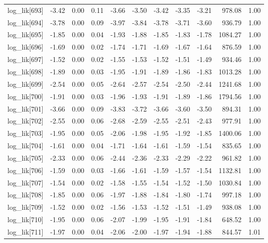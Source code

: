 \begin{table}[ht]
\begin{tabular}{rrrrrrrrrrr}
  log\_lik[693] & -3.42 & 0.00 & 0.11 & -3.66 & -3.50 & -3.42 & -3.35 & -3.21 & 978.08 & 1.00 \\ 
  log\_lik[694] & -3.78 & 0.00 & 0.09 & -3.97 & -3.84 & -3.78 & -3.71 & -3.60 & 936.79 & 1.00 \\ 
  log\_lik[695] & -1.85 & 0.00 & 0.04 & -1.93 & -1.88 & -1.85 & -1.83 & -1.78 & 1084.27 & 1.00 \\ 
  log\_lik[696] & -1.69 & 0.00 & 0.02 & -1.74 & -1.71 & -1.69 & -1.67 & -1.64 & 876.59 & 1.00 \\ 
  log\_lik[697] & -1.52 & 0.00 & 0.02 & -1.55 & -1.53 & -1.52 & -1.51 & -1.49 & 934.46 & 1.00 \\ 
  log\_lik[698] & -1.89 & 0.00 & 0.03 & -1.95 & -1.91 & -1.89 & -1.86 & -1.83 & 1013.28 & 1.00 \\ 
  log\_lik[699] & -2.54 & 0.00 & 0.05 & -2.64 & -2.57 & -2.54 & -2.50 & -2.44 & 1241.68 & 1.00 \\ 
  log\_lik[700] & -1.91 & 0.00 & 0.03 & -1.96 & -1.93 & -1.91 & -1.89 & -1.86 & 1794.56 & 1.00 \\ 
  log\_lik[701] & -3.66 & 0.00 & 0.09 & -3.83 & -3.72 & -3.66 & -3.60 & -3.50 & 894.31 & 1.00 \\ 
  log\_lik[702] & -2.55 & 0.00 & 0.06 & -2.68 & -2.59 & -2.55 & -2.51 & -2.43 & 977.91 & 1.00 \\ 
  log\_lik[703] & -1.95 & 0.00 & 0.05 & -2.06 & -1.98 & -1.95 & -1.92 & -1.85 & 1400.06 & 1.00 \\ 
  log\_lik[704] & -1.61 & 0.00 & 0.04 & -1.71 & -1.64 & -1.61 & -1.59 & -1.54 & 835.65 & 1.00 \\ 
  log\_lik[705] & -2.33 & 0.00 & 0.06 & -2.44 & -2.36 & -2.33 & -2.29 & -2.22 & 961.82 & 1.00 \\ 
  log\_lik[706] & -1.59 & 0.00 & 0.03 & -1.66 & -1.61 & -1.59 & -1.57 & -1.54 & 1132.81 & 1.00 \\ 
  log\_lik[707] & -1.54 & 0.00 & 0.02 & -1.58 & -1.55 & -1.54 & -1.52 & -1.50 & 1030.84 & 1.00 \\ 
  log\_lik[708] & -1.85 & 0.00 & 0.06 & -1.97 & -1.88 & -1.84 & -1.80 & -1.74 & 997.18 & 1.00 \\ 
  log\_lik[709] & -1.52 & 0.00 & 0.02 & -1.56 & -1.53 & -1.52 & -1.51 & -1.49 & 938.08 & 1.00 \\ 
  log\_lik[710] & -1.95 & 0.00 & 0.06 & -2.07 & -1.99 & -1.95 & -1.91 & -1.84 & 648.52 & 1.00 \\ 
  log\_lik[711] & -1.97 & 0.00 & 0.04 & -2.06 & -2.00 & -1.97 & -1.94 & -1.88 & 844.57 & 1.01 \\ 

\end{tabular}
\end{table}
